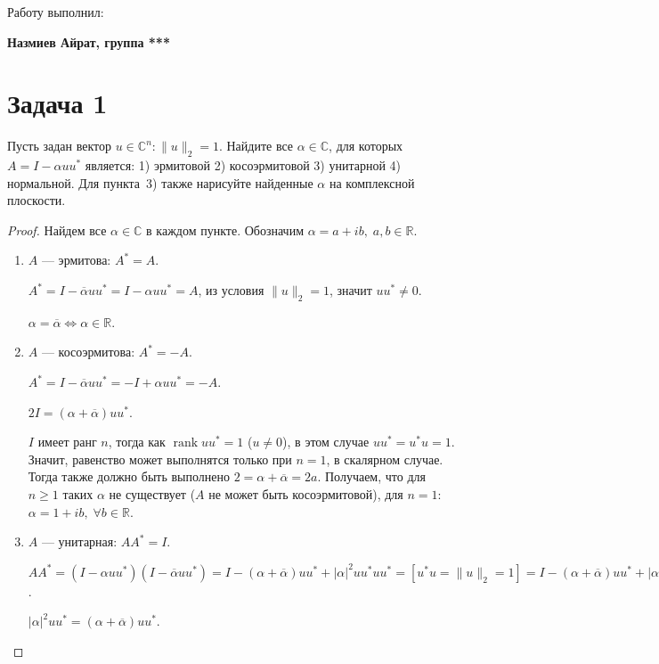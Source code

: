 \documentclass{article}
\newcommand{\rank}{\operatorname{rank}}
\newtheorem*{proof}{$\square$}
\newcommand{\conj}[1]{\overline{#1}}
\newcommand{\R}{\mathbb{R}}
\renewcommand{\geq}{\geqslant}
\begin{document}
		\begin{center}
			Работу выполнил:
            
            \textbf{Назмиев Айрат, группа ***}
		\end{center}

		\section*{Задача 1}
		
		Пусть задан вектор $u\in\mathbb{C}^n\colon \|u\|_2=1$. Найдите все $\alpha \in \mathbb{C}$, для которых $A = I - \alpha u u^*$ является: 1) эрмитовой 2) косоэрмитовой 3) унитарной 4) нормальной. Для пункта~{3)} также нарисуйте найденные $\alpha$ на комплексной плоскости.
		
		\begin{proof} Найдем все $\alpha \in \mathbb{C}$ в каждом пункте. Обозначим $\alpha = a + ib,\;a,b\in\R$.
		\begin{enumerate}
			\item 
			$A$ --- эрмитова: $A^* = A$.
			
			$A^* = I - \conj\alpha u u^* = I - \alpha u u^* = A$, из условия $\|u\|_2=1$, значит $u u^*\neq 0$.
			
			$\alpha = \conj{\alpha} \iff \alpha \in \mathbb{R}$.
			
			\item
			$A$ --- косоэрмитова: $A^* = -A$.
			
			$A^* = I - \conj{\alpha} u u^* = -I + \alpha u u^* = -A$.
			
			$2I = (\alpha + \conj\alpha) u u^*$.
			
			$I$ имеет ранг $n$, тогда как $\rank{u u^*} = 1$ ($u \neq 0$), в этом случае $u u^* = u^* u = 1$. Значит, равенство может выполнятся только при $n=1$, в скалярном случае. Тогда также должно быть выполнено $2 = \alpha + \conj\alpha = 2a$. Получаем, что для $n\geq 1$ таких $\alpha$ не существует ($A$ не может быть косоэрмитовой), для $n=1$: $\alpha = 1 + ib,\;\forall b\in \R$.
			
			
			\item 
			$A$ --- унитарная: $A A^* = I$.
			
			$A A^* = (I -\alpha u u^*)(I -\conj\alpha u u^*) = I - (\alpha + \conj\alpha) u u^* + |\alpha|^2 u u^* u u^* = [u^* u = \|u\|_2 = 1] = I - (\alpha + \conj\alpha) u u^* + |\alpha|^2 u u^* = I$.
			
			$|\alpha|^2 u u^* = (\alpha + \conj\alpha) u u^*$.
			

\end{enumerate}
\end{proof}
\end{document}
